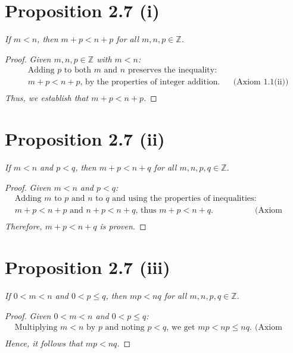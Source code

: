 \section*{Proposition 2.7 (i)}
\textit{If $m < n$, then $m+p < n+p$ for all $m, n, p \in \mathbb{Z}$.}
\begin{proof}
    \textit{Given $m, n, p \in \mathbb{Z}$ with $m < n$:}
    \begin{align*}
        & \text{Adding $p$ to both $m$ and $n$ preserves the inequality:} & & \\
        & \text{$m + p < n + p$, by the properties of integer addition.} & & \text{(Axiom 1.1(ii))} \\
    \end{align*}
    \textit{Thus, we establish that $m + p < n + p$.}
\end{proof}

\section*{Proposition 2.7 (ii)}
\textit{If $m < n$ and $p < q$, then $m + p < n + q$ for all $m, n, p, q \in \mathbb{Z}$.}
\begin{proof}
    \textit{Given $m < n$ and $p < q$:}
    \begin{align*}
        & \text{Adding $m$ to $p$ and $n$ to $q$ and using the properties of inequalities:} & & \\
        & \text{$m + p < n + p$ and $n + p < n + q$, thus $m + p < n + q$.} & & \text{(Axiom 1.1(ii))} \\
    \end{align*}
    \textit{Therefore, $m + p < n + q$ is proven.}
\end{proof}

\section*{Proposition 2.7 (iii)}
\textit{If $0 < m < n$ and $0 < p \leq q$, then $mp < nq$ for all $m, n, p, q \in \mathbb{Z}$.}
\begin{proof}
    \textit{Given $0 < m < n$ and $0 < p \leq q$:}
    \begin{align*}
        & \text{Multiplying $m < n$ by $p$ and noting $p < q$, we get $mp < np \leq nq$.} & & \text{(Axiom 2.1(ii))} \\
    \end{align*}
    \textit{Hence, it follows that $mp < nq$.}
\end{proof}

